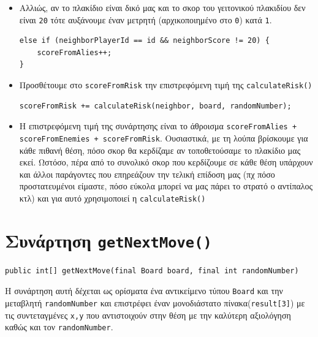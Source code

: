 \begin{itemize}
\item Αλλιώς, αν το πλακίδιο είναι δικό μας και το σκορ του γειτονικού πλακιδίου
δεν είναι \lstinline!20! τότε αυξάνουμε έναν μετρητή
(αρχικοποιημένο στο \lstinline!0!) κατά \lstinline!1!.
\begin{lstlisting}[numbers=none, aboveskip=\smallskipamount, belowskip=\smallskipamount, captionpos=none]
else if (neighborPlayerId == id && neighborScore != 20) {
    scoreFromAlies++;
}
\end{lstlisting}

\item Προσθέτουμε στο \lstinline!scoreFromRisk! την επιστρεφόμενη τιμή της \lstinline!calculateRisk()!
\begin{lstlisting}[numbers=none, aboveskip=\smallskipamount, belowskip=\smallskipamount, captionpos=none]
scoreFromRisk += calculateRisk(neighbor, board, randomNumber);
\end{lstlisting}

\item Η επιστρεφόμενη τιμή της συνάρτησης είναι το άθροισμα
\lstinline!scoreFromAlies + scoreFromEnemies + scoreFromRisk!.
Ουσιαστικά, με τη λούπα βρίσκουμε για κάθε πιθανή θέση, πόσο σκορ θα κερδίζαμε αν τοποθετούσαμε το πλακίδιο μας εκεί.
Ωστόσο, πέρα από το συνολικό σκορ που κερδίζουμε σε κάθε θέση υπάρχουν και άλλοι
παράγοντες που επηρεάζουν την τελική επίδοση μας (πχ πόσο προστατευμένοι είμαστε, πόσο εύκολα μπορεί να μας πάρει το στρατό ο αντίπαλος κτλ) και για αυτό χρησιμοποιεί η \lstinline!calculateRisk()!
\end{itemize}

\section{Συνάρτηση \texttt{getNextMove()}}
\begin{lstlisting}[numbers=none, title={Declaration της συνάρτησης}]
public int[] getNextMove(final Board board, final int randomNumber)
\end{lstlisting}
Η συνάρτηση αυτή δέχεται ως ορίσματα ένα αντικείμενο τύπου \lstinline!Board! και
την μεταβλητή \lstinline!randomNumber! και επιστρέφει έναν
μονοδιάστατο πίνακα(\lstinline!result[3]!) με τις συντεταγμένες \lstinline!x,y!
που αντιστοιχούν στην θέση με την καλύτερη αξιολόγηση καθώς και τον
\lstinline!randomNumber!.

